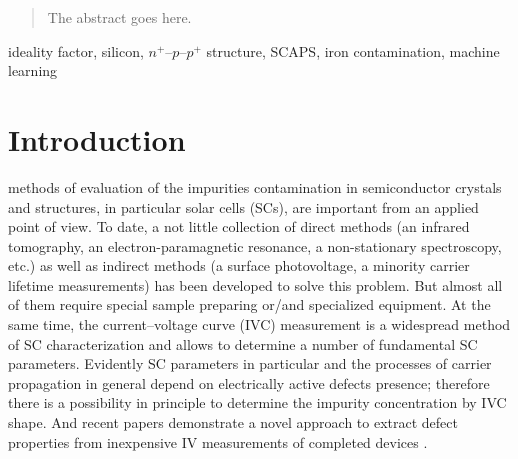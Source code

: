 \documentclass[journal]{IEEEtran}
\begin{document}







\maketitle

\begin{abstract}
The abstract goes here.
\end{abstract}

\begin{IEEEkeywords}
ideality factor, silicon, $n^+$--$p$--$p^+$ structure, SCAPS, iron contamination, machine learning
\end{IEEEkeywords}






%
\IEEEpeerreviewmaketitle



\section{Introduction}


 methods of evaluation of the impurities contamination in semiconductor crystals and structures, in particular solar cells (SCs), are important from an applied point of view.
To date, a not little collection of direct methods (an infrared tomography, an electron-paramagnetic resonance, a non-stationary spectroscopy, etc.) as well as indirect methods (a surface photovoltage, a minority carrier lifetime measurements) has been developed to solve this problem.
But almost all of them require special sample preparing or/and specialized equipment.
At the same time, the current--voltage curve (IVC) measurement is a widespread method of SC characterization and allows to determine a number of fundamental SC parameters.
Evidently SC parameters in particular and the processes of carrier propagation in general depend on electrically active defects presence; therefore there is a possibility in principle to determine the impurity concentration by IVC shape.
And recent papers demonstrate a novel approach to extract
defect properties from inexpensive IV measurements of completed
devices \cite{HowMuchPhysics}.
\end{document}
